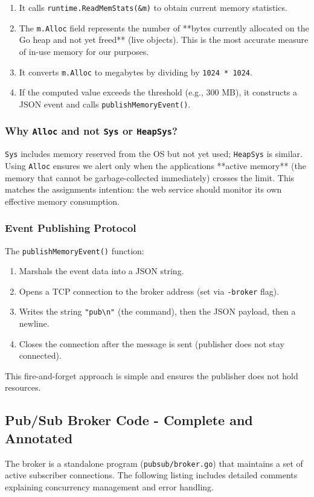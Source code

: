 \documentclass[a4paper]{article}
\begin{document}
\begin{enumerate}
    \item It calls \texttt{runtime.ReadMemStats(\&m)} to obtain current memory statistics.
    \item The \texttt{m.Alloc} field represents the number of **bytes currently allocated on the Go heap and not yet freed** (live objects). This is the most accurate measure of in-use memory for our purposes.
    \item It converts \texttt{m.Alloc} to megabytes by dividing by \texttt{1024 * 1024}.
    \item If the computed value exceeds the threshold (e.g., 300 MB), it constructs a JSON event and calls \texttt{publishMemoryEvent()}.
\end{enumerate}

\subsubsection{Why \texttt{Alloc} and not \texttt{Sys} or \texttt{HeapSys}?}
\texttt{Sys} includes memory reserved from the OS but not yet used; \texttt{HeapSys} is similar. Using \texttt{Alloc} ensures we alert only when the applications **active memory** (the memory that cannot be garbage-collected immediately) crosses the limit. This matches the assignments intention: the web service should monitor its own effective memory consumption.

\subsubsection{Event Publishing Protocol}
The \texttt{publishMemoryEvent()} function:
\begin{enumerate}
    \item Marshals the event data into a JSON string.
    \item Opens a TCP connection to the broker address (set via \texttt{-broker} flag).
    \item Writes the string \texttt{"pub\textbackslash n"} (the command), then the JSON payload, then a newline.
    \item Closes the connection after the message is sent (publisher does not stay connected).
\end{enumerate}
This fire-and-forget approach is simple and ensures the publisher does not hold resources.

\subsection{Pub/Sub Broker Code - Complete and Annotated}
The broker is a standalone program (\texttt{pubsub/broker.go}) that maintains a set of active subscriber connections. The following listing includes detailed comments explaining concurrency management and error handling.
\end{document}
